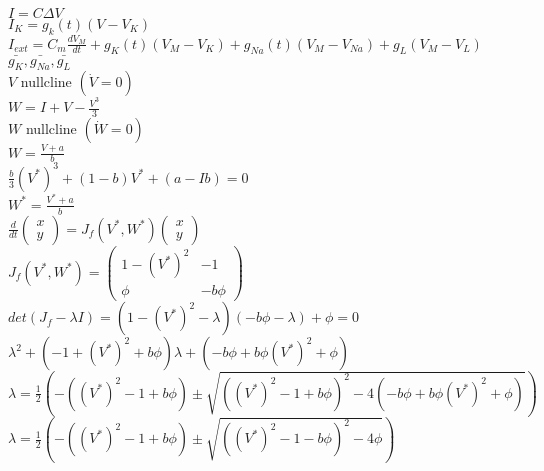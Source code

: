 \documentclass[12pt,a4paper]{article}
\begin{document}
%
%



%
%


%
%

$ I = C \Delta V$ \\

$I_K = g_k(t)(V - V_K)$ \\

$I_{ext} = C_m \frac{dV_M}{dt} + g_K(t) (V_M -V_K)  + g_{Na}(t)  (V_M -V_{Na}) + g_L (V_M -V_L)$\\

$\bar{g_K}, \bar{g_{Na}}, \bar{g_L}$ \\

$V$ nullcline $(\dot{V} = 0)$\\
 $W = I + V - \frac{V^3}{3}$\\
 
$W$ nullcline $(\dot{W} = 0)$ \\
$W = \frac{V + a}{b}$\\


$\frac{b}{3} (V^*)^3 + (1-b)V^* + (a - Ib) = 0$\\
$W^* = \frac{V^* + a}{b}$\\


$\frac{d}{dt} \begin{pmatrix}
x \\
y
\end{pmatrix} = J_f(V^*, W^*) \begin{pmatrix}
x\\
y
\end{pmatrix}$ \\

$J_f(V^*, W^*) = \begin{pmatrix}
1 - (V^*)^2 & -1 \\
\phi & -b\phi

\end{pmatrix}$ \\

$det(J_f - \lambda I) = (1 - (V^*)^2 - \lambda)(-b\phi - \lambda) + \phi = 0$ \\

$\lambda^2 + (-1 + (V^*)^2 + b\phi)\lambda + (-b\phi + b\phi (V^*)^2 + \phi)$ \\

$\lambda = \frac{1}{2} \left(-((V^*)^2 - 1 + b\phi) \pm \sqrt{((V^*)^2 - 1 + b\phi)^2 - 4(-b\phi + b\phi (V^*)^2 + \phi) }  \right)$ \\

$\lambda = \frac{1}{2} \left(-((V^*)^2 - 1 + b\phi) \pm \sqrt{((V^*)^2 - 1 - b\phi)^2 - 4\phi }  \right)$
\end{document}

